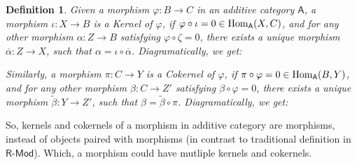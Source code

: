 \documentclass[x11names,reqno,12pt]{extarticle}
\newtheorem{defn}{Definition}
\newcommand{\Hom}{\textmd{Hom}}
\newcommand{\cat}[1]{\textsf{#1}}
\begin{document}
\begin{defn}
    Given a morphism $\varphi:B\rightarrow C$ in an additive category $\cat{A}$, a morphism $\iota:X\rightarrow B$ is a \emph{Kernel of $\varphi$}, if $\varphi\circ \iota = 0 \in \Hom_\cat{A}(X,C)$, and for any other morphism $\alpha:Z \rightarrow B$ satisfying $\varphi\circ \zeta = 0$, there exists a unique morphism $\overline{\alpha}:Z\rightarrow X$, such that $\alpha=\iota\circ\overline{\alpha}$. Diagramatically, we get:
    \begin{center}
    \end{center}
    Similarly, a morphism $\pi:C\rightarrow Y$ is a \emph{Cokernel of $\varphi$}, if $\pi\circ\varphi = 0 \in \Hom_\cat{A}(B, Y)$, and for any other morphism $\beta:C\rightarrow Z'$ satisfying $\beta\circ\varphi = 0$, there exists a unique morphism $\tilde{\beta}: Y\rightarrow Z'$, such that $\beta = \tilde{\beta}\circ \pi$. Diagramatically, we get:
    \begin{center}
    \end{center}
\end{defn}
So, kernels and cokernels of a morphism in additive category are morphisms, instead of objects paired with morphisms (in contrast to traditional definition in $\cat{R-Mod}$). Which, a morphism could have mutliple kernels and cokernels. 

\hfill
\end{document}
